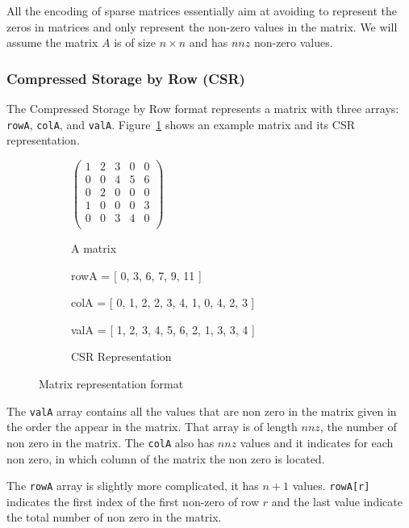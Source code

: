 \documentclass[sigconf,review,anonymous]{acmart}
\begin{document}
All the encoding of sparse matrices essentially aim at avoiding to
represent the zeros in matrices and only represent the non-zero values
in the matrix. We will assume the matrix $A$ is of size $n \times n$
and has $nnz$ non-zero values.

\subsubsection{Compressed Storage by Row (CSR)}

The Compressed Storage by Row format represents a matrix with three
arrays: \texttt{rowA}, \texttt{colA}, and
\texttt{valA}. Figure~\ref{fig:matrepcsr} shows an example matrix and
its CSR representation.

\begin{figure}
  \begin{subfigure}[b]{.3\linewidth}
    $\begin{pmatrix}
      1 & 2 & 3 & 0 & 0 \\
      0 & 0 & 4 & 5 & 6 \\
      0 & 2 & 0 & 0 & 0 \\
      1 & 0 & 0 & 0 & 3 \\
      0 & 0 & 3 & 4 & 0 \\
    \end{pmatrix}$

    \caption{A matrix}
  \end{subfigure}
  \begin{subfigure}[b]{.6\linewidth}
    rowA = [ 0, 3, 6, 7, 9, 11 ] 
    
    colA = [ 0, 1, 2, 2, 3, 4, 1, 0, 4, 2, 3 ] 
    
    valA = [ 1, 2, 3, 4, 5, 6, 2, 1, 3, 3, 4 ]

    \caption{CSR Representation}
  \end{subfigure}
  
  \caption{Matrix representation format}
  \label{fig:matrepcsr}
\end{figure}

The \texttt{valA} array contains all the values that are non zero in
the matrix given in the order the appear in the matrix. That array is
of length $nnz$, the number of non zero in the matrix. The
\texttt{colA} also has $nnz$ values and it indicates for each non
zero, in which column of the matrix the non zero is located.

The \texttt{rowA} array is slightly more complicated, it has $n+1$
values. \texttt{rowA[r]} indicates the first index of the first
non-zero of row $r$ and the last value indicate the total number of
non zero in the matrix.
\end{document}
